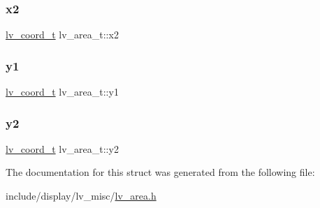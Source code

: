 \subsubsection{\texorpdfstring{x2}{x2}}
{\footnotesize\ttfamily \mbox{\hyperlink{lv__area_8h_ad98932f5017f20988532bb68b32a6d76}{lv\+\_\+coord\+\_\+t}} lv\+\_\+area\+\_\+t\+::x2}

\mbox{\label{structlv__area__t_a8e6b43ed9ab280f66ae4e00af312ca27}} 
\subsubsection{\texorpdfstring{y1}{y1}}
{\footnotesize\ttfamily \mbox{\hyperlink{lv__area_8h_ad98932f5017f20988532bb68b32a6d76}{lv\+\_\+coord\+\_\+t}} lv\+\_\+area\+\_\+t\+::y1}

\mbox{\label{structlv__area__t_ac3da01ffe2d07a8e446684160dd1f7fc}} 
\subsubsection{\texorpdfstring{y2}{y2}}
{\footnotesize\ttfamily \mbox{\hyperlink{lv__area_8h_ad98932f5017f20988532bb68b32a6d76}{lv\+\_\+coord\+\_\+t}} lv\+\_\+area\+\_\+t\+::y2}



The documentation for this struct was generated from the following file\+:\begin{DoxyCompactItemize}
\item 
include/display/lv\+\_\+misc/\mbox{\hyperlink{lv__area_8h}{lv\+\_\+area.\+h}}\end{DoxyCompactItemize}
